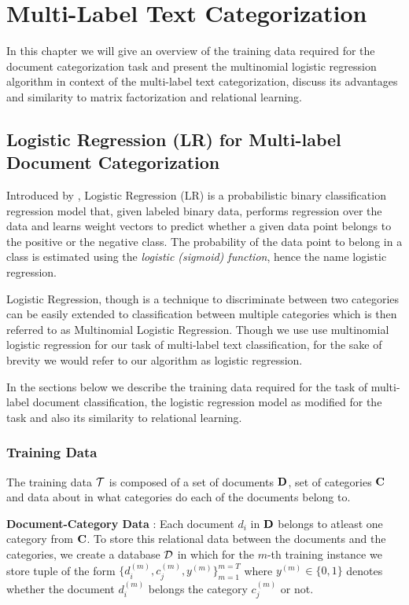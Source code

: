 \chapter{Multi-Label Text Categorization}
\label{chapter:mltextcat}
In this chapter we will give an overview of the training data required for the document categorization task and present the multinomial logistic regression algorithm in context of the multi-label text categorization, discuss its advantages and similarity to matrix factorization and relational learning.

\section{Logistic Regression (LR) for Multi-label Document Categorization}
\label{sec:lrtc}
Introduced by \citep{hosmer1989applied}, Logistic Regression (LR) is a probabilistic binary classification regression model that, given labeled binary data, performs regression over the data and learns weight vectors to predict whether a given data point belongs to the positive or the negative class. 
The probability of the data point to belong in a class is estimated using the \emph{logistic (sigmoid) function}, hence the name logistic regression.

Logistic Regression, though is a technique to discriminate between two categories can be easily extended to classification between multiple categories which is then referred to as Multinomial Logistic Regression. 
Though we use use multinomial logistic regression for our task of multi-label text classification, for the sake of brevity we would refer to our algorithm as logistic regression.\

In the sections below we describe the training data required for the task of multi-label document classification, the logistic regression model as modified for the task and also its similarity to relational learning.

\subsection{Training Data}
\label{sec:trdata_lr}
The training data $\mathcal{T}$ is composed of a set of documents $\mathbf{D}$, set of categories $\mathbf{C}$ and data about in what categories do each of the documents belong to. 

\textbf{Document-Category Data} : 
Each document $d_{i}$ in $\mathbf{D}$ belongs to atleast one category from $\mathbf{C}$. To store this relational data between the documents and the categories, we create a database $\mathcal{D}$ in which for the $m$-th training instance we store tuple of the form $\{ d^{(m)}_{i}, c^{(m)}_{j}, y^{(m)}\}^{m=T}_{m=1}$ where $y^{(m)} \in \{0, 1\}$ denotes whether the document $d^{(m)}_{i}$ belongs the category $c^{(m)}_{j}$ or not. 

